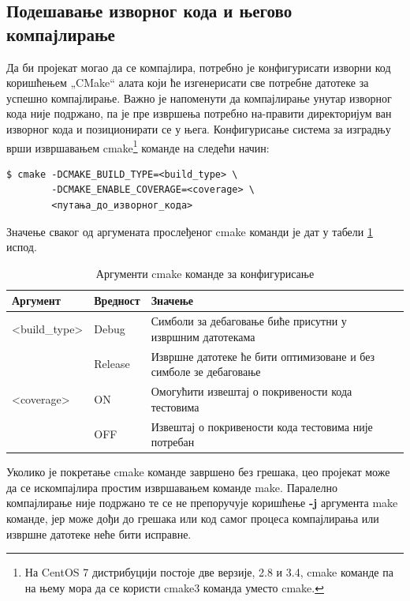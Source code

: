 \documentclass[a4paper, 12pt, diplomski]{etfcyr}
\def\quote#1{„#1“}
\begin{document}
			\subsection{Подешавање изворног кода и његово компајлирање}
				\begin{justify}
					Да би пројекат могао да се компајлира, потребно је конфигурисати изворни код коришћењем \quote{CMake} алата који ће изгенерисати све потребне датотеке за успешно компајлирање. Важно је напоменути да компајлирање унутар изворног кода није подржано, па је пре извршења потребно на-правити директоријум ван изворног кода и позиционирати се у њега. Конфигурисање система за изградњу врши извршавањем cmake\footnote{На CentOS 7 дистрибуцији постоје две верзије, 2.8 и 3.4, cmake команде па на њему мора да се користи cmake3 команда уместо cmake.} команде на следећи начин:
					\begin{footnotesize}
						\begin{verbatim}
$ cmake -DCMAKE_BUILD_TYPE=<build_type> \
        -DCMAKE_ENABLE_COVERAGE=<coverage> \
        <путања_до_изворног_кода>
						\end{verbatim}
					\end{footnotesize}
					Значење сваког од аргумената прослеђеног cmake команди је дат у табели \ref{table:cmake_run_options} испод.
					\begin{table}[H]
						\begin{tabular}{l l p{8cm}}
							Аргумент & Вредност & Значење \\
							\hline
							<build\_type> & Debug & Симболи за дебаговање биће присутни у извршним датотекама \\
							& Release & Извршне датотеке ће бити оптимизоване и без симболе зе дебаговање \\
							<coverage> & ON & Омогућити извештај о покривености кода тестовима \\
							& OFF & Извештај о покривености кода тестовима није потребан \\
							\hline
						\end{tabular}
						\caption{Аргументи cmake команде за конфигурисање}
						\label{table:cmake_run_options}
					\end{table}
					Уколико је покретање cmake команде завршено без грешака, цео пројекат може да се искомпајлира простим извршавањем команде make. Паралелно компајлирање није подржано те се не препоручује коришћење \textbf{-j} аргумента make команде, јер може дођи до грешака или код самог процеса компајлирања или извршне датотеке неће бити исправне.
				\end{justify}
\end{document}
